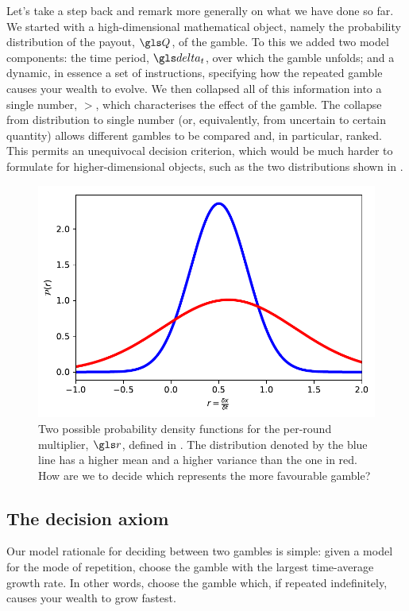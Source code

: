 Let's take a step back and remark more generally on what we have done so far. We 
started with a high-dimensional mathematical object, namely the 
probability distribution of the payout, $\Q$, of the gamble. To this we 
added two model components: the time period, $\dt$, over which the 
gamble unfolds; and a dynamic, in essence a set of instructions, specifying 
how the repeated gamble causes your wealth to evolve. We 
then collapsed all of this information into a single number, 
$\gt$, which characterises the effect of the gamble. The collapse from 
distribution to single number (or, equivalently, from uncertain to certain 
quantity) allows different gambles to be compared and, in particular, 
ranked. This permits an unequivocal decision criterion, which would be 
much harder to formulate for higher-dimensional objects, such as the 
two distributions shown in .
\begin{figure}
\centering
\includegraphics[width=\textwidth]{./chapter_decisions/figs/two_dists.pdf}
\caption{Two possible probability density functions for the per-round 
multiplier, $\gr$, defined in . The distribution denoted by 
the blue line has a higher mean and a higher variance than the one 
in red. How are we to decide which represents the more favourable 
gamble?}
\end{figure}

\subsection{The decision axiom}
Our model rationale for deciding between two gambles is simple: 
given a model for the mode of repetition, 
choose the gamble with the largest time-average growth rate. 
In other words, choose the gamble which, 
if repeated indefinitely, causes your wealth to grow fastest.

